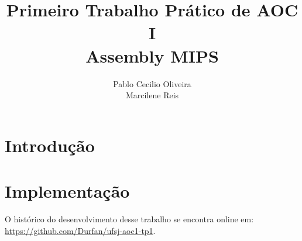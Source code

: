 \documentclass[12pt,a4paper]{article}
\author{Pablo Cecilio Oliveira\\
Marcilene Reis}
\title{Primeiro Trabalho Prático de AOC I\\
Assembly MIPS}
\date{}
\begin{document}
\maketitle

\section{Introdução}


\section{Implementação}



\begin{flushleft}
	\nocite{*}
	
	\vfill
	O histórico do desenvolvimento desse trabalho se encontra online em:\\ \url{https://github.com/Durfan/ufsj-aoc1-tp1}.
\end{flushleft}
\end{document}
